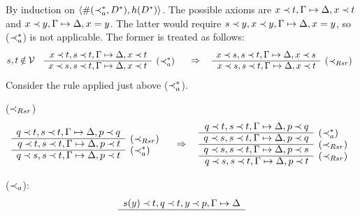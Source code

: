\begin{PROOF}
By induction on $\langle \#(\mathbin{\prec}_a^*,D^*),h(D^*)\rangle$. 
The possible axioms are $x\mathbin{\prec} t,\Gamma\mathrel{\mapsto}\Delta,x\mathbin{\prec} t$ and $x\mathbin{\prec} y,\Gamma\mathrel{\mapsto}\Delta,x=y$. 
The latter would require $s\mathbin{\prec} y, x\mathbin{\prec} y,\Gamma\mathrel{\mapsto}\Delta,x=y$, so ($\mathbin{\prec}_a^*$) is not
applicable. The former is treated as follows:
\[
s,t\not\in\Vars\ \ \ \begin{array}{rl}
x\Incl t, s\Incl t,\GSD,x\Incl t &  \\ \cline{1-1}
x\Incl s, s\Incl t,\GSD,x\Incl t & \rabove{(\Incl_a^*)}
\end{array}
\conv
\begin{array}{rl}
x\Incl s, s\Incl t,\GSD,x\Incl s \\ \cline{1-1}
x\Incl s,s\Incl t, \GSD,x\Incl t & \rabove{(\Rsr)}
\end{array}
\]
Consider the rule
applied just above ($\mathbin{\prec}_a^*$).
\begin{LS}
\item ($\mathbin{\prec}_{Rsr}$)
\[ \begin{array}{rl}
q\Incl t, s\Incl t,\GSD,p\Incl q \\ \cline{1-1}
q\Incl t, s\Incl t,\GSD,p\Incl t & \rabove{(\Rsr)} \\ \cline{1-1}
q\Incl s, s\Incl t,\GSD,p\Incl t & \rabove{(\Incl_a^*)}
\end{array}
\conv
\begin{array}{rl}
q\Incl t, s\Incl t,\GSD,p\Incl q \\ \cline{1-1}
q\Incl s, s\Incl t,\GSD,p\Incl q & \rabove{(\Incl_a^*)} \\ \cline{1-1}
q\Incl s, s\Incl t,\GSD,p\Incl s & \rabove{(\Rsr)} \\ \cline{1-1}
q\Incl s, s\Incl t,\GSD,p\Incl t & \rabove{(\Rsr)}
\end{array}
\]
\item ($\mathbin{\prec}_a$):
\[ \begin{array}{rl}
 s(y) \Incl t, q\Incl t, y\Incl p, \GSD \\ \cline{1-1}

\end{array}\]
\end{LS}
\end{PROOF}
